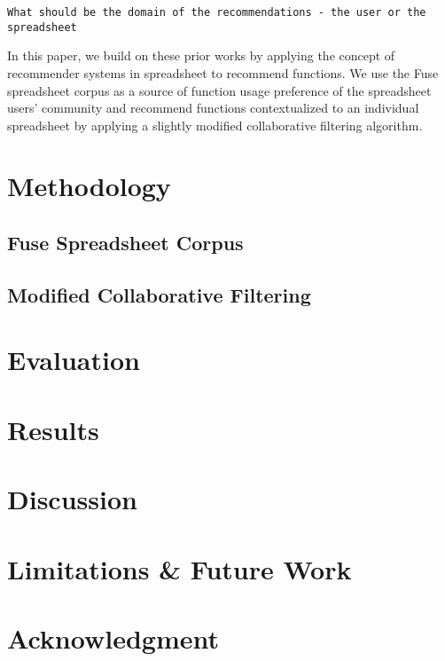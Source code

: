 \documentclass[conference]{IEEEtran}
\begin{document}
\texttt{What should be the domain of the recommendations - the user or the spreadsheet}

In this paper, we build on these prior works by applying the concept of recommender systems in spreadsheet to recommend functions. We use the Fuse spreadsheet corpus as a source of function usage preference of the spreadsheet users' community and recommend functions contextualized to an individual spreadsheet by applying a slightly modified collaborative filtering algorithm.

\section{Methodology}

\subsection{Fuse Spreadsheet Corpus}

\subsection{Modified Collaborative Filtering}

\section{Evaluation}


\section{Results}

\section{Discussion}

\section{Limitations \& Future Work}

\section*{Acknowledgment}
\end{document}
